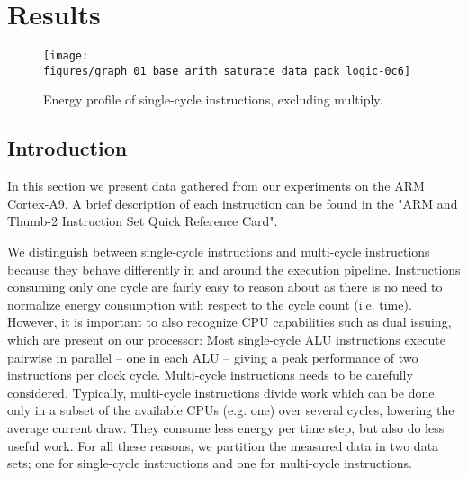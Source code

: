 \section{Results}

%
%
%
%

\begin{figure*}[ht]
    \centering
    \texttt{[image: figures/graph\_01\_base\_arith\_saturate\_data\_pack\_logic-0c6]}
    \caption{Energy profile of single-cycle instructions, excluding multiply.}
    \label{fig:singlecycle}
\end{figure*}



\subsection{Introduction}
In this section we present data gathered from our experiments on the ARM
Cortex-A9. A brief description of each instruction can be found in the "ARM and
Thumb-2 Instruction Set Quick Reference Card"\cite{armasmref}.

We distinguish between single-cycle instructions and multi-cycle instructions
because they behave differently in and around the execution pipeline.
Instructions consuming only one cycle are fairly easy to reason about as there
is no need to normalize energy consumption with respect to the cycle count (i.e.
time). However, it is important to also recognize CPU capabilities such as dual
issuing, which are present on our processor: Most single-cycle ALU instructions
execute pairwise in parallel -- one in each ALU -- giving a peak performance of
two instructions per clock cycle. Multi-cycle instructions needs to be carefully
considered. Typically, multi-cycle instructions divide work which can be done
only in a subset of the available CPUs (e.g. one) over several cycles, lowering
the average current draw. They consume less energy per time step, but also do
less useful work. For all these reasons, we partition the measured data in two
data sets; one for single-cycle instructions and one for multi-cycle
instructions.

